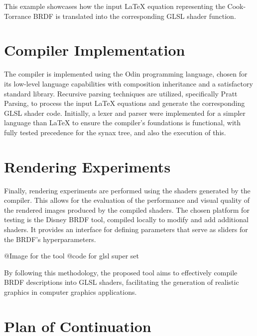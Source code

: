 \documentclass[english, 
               brazil, 
               bsc] %
               {dcomp-abntex2}
\begin{document}
This example showcases how the input LaTeX equation representing the Cook-Torrance BRDF is translated into the corresponding GLSL shader function.

\section{Compiler Implementation}

The compiler is implemented using the Odin programming language, chosen for its low-level language capabilities with composition inheritance and a satisfactory standard library. Recursive parsing techniques are utilized, specifically Pratt Parsing, to process the input LaTeX equations and generate the corresponding GLSL shader code. Initially, a lexer and parser were implemented for a simpler language than LaTeX to ensure the compiler's foundations is functional, with fully tested precedence for the synax tree, and also the execution of this.

\section{Rendering Experiments}

Finally, rendering experiments are performed using the shaders generated by the compiler. This allows for the evaluation of the performance and visual quality of the rendered images produced by the compiled shaders. The chosen platform for testing is the Disney BRDF tool, compiled locally to modify and add additional shaders. It provides an interface for defining parameters that serve as sliders for the BRDF's hyperparameters.

@Image for the tool
@code for glsl super set

By following this methodology, the proposed tool aims to effectively compile BRDF descriptions into GLSL shaders, facilitating the generation of realistic graphics in computer graphics applications.

\section{Plan of Continuation}
\end{document}
